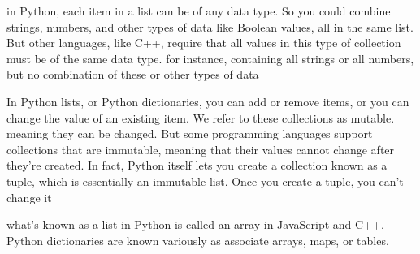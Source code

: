 in Python, each item in a list can be of any data type.
 So you could combine strings, numbers, and other types of data like Boolean values, all in the same list. 
But other languages, like C++, require that all values in this type of collection must be of the same data type. 
for instance, containing all strings or all numbers, but no combination of these or other types of data


In Python lists, or Python dictionaries, you can add or remove items, or you can change the value of an existing item.
We refer to these collections as mutable.
meaning they can be changed. 
But some programming languages support collections that are immutable, meaning that their values cannot change after they're created.
In fact, Python itself lets you create a collection known as a tuple, which is essentially an immutable list. 
Once you create a tuple, you can't change it\

what's known as a list in Python is called an array in JavaScript and C++. 
Python dictionaries are known variously as associate arrays, maps, or tables.